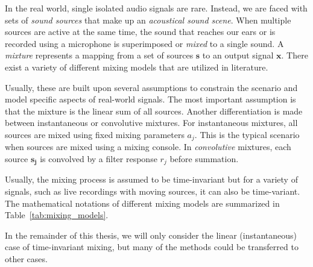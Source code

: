 In the real world, single isolated audio signals are rare.
Instead, we are faced with sets of \emph{sound sources} that make up an \emph{acoustical sound scene}.
When multiple sources are active at the same time, the sound that reaches our ears or is recorded using a microphone is superimposed or \emph{mixed} to a single sound.
A \emph{mixture} represents a mapping from a set of sources \(\mathbf{s}\) to an output signal \(\mathbf{x}\).
There exist a variety of different mixing models that are utilized in literature.
\par
Usually, these are built upon several assumptions to constrain the scenario and model specific aspects of real-world signals.
The most important assumption is that the mixture is the linear sum of all sources.
Another differentiation is made between instantaneous or convolutive mixtures.
For instantaneous mixtures, all sources are mixed using fixed mixing parameters \(a_j\).
This is the typical scenario when sources are mixed using a mixing console.
In \emph{convolutive} mixtures, each source \(\mathbf{s_j}\) is convolved by a filter response \(r_j\) before summation.
\par
Usually, the mixing process is assumed to be time-invariant but for a variety of signals, such as live recordings with moving sources, it can also be time-variant.
The mathematical notations of different mixing models are summarized in Table~\ref{tab:mixing_models}.
\par
In the remainder of this thesis, we will only consider the linear (instantaneous) case of time-invariant mixing, but many of the methods could be transferred to other cases.

